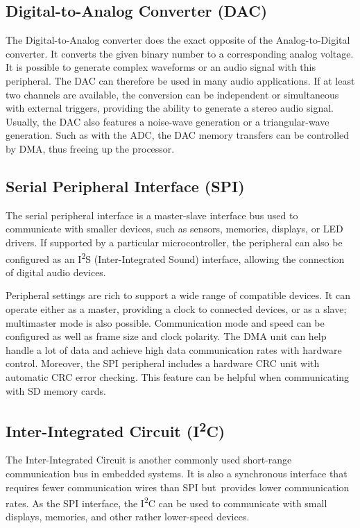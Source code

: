 	\subsection{Digital-to-Analog Converter (DAC)}
	\label{sub:dac}
The Digital-to-Analog converter does the exact opposite of the Analog-to-Digital converter. It converts the given binary number to a corresponding analog voltage. It is possible to generate complex waveforms or an audio signal with this peripheral. The DAC can therefore be used in many audio applications. If at least two channels are available, the conversion can be independent or simultaneous with external triggers, providing the ability to generate a stereo audio signal. Usually, the DAC also features a noise-wave generation or a triangular-wave generation. Such as with the ADC, the DAC memory transfers can be controlled by DMA, thus freeing up the processor.

	\subsection{Serial Peripheral Interface (SPI)}
	\label{sub:spi}
The serial peripheral interface is a master-slave interface bus used to communicate with smaller devices, such as sensors, memories, displays, or LED drivers. If supported by a particular microcontroller, the peripheral can also be configured as an I\textsuperscript{2}S (Inter-Integrated Sound) interface, allowing the connection of digital audio devices.

Peripheral settings are rich to support a wide range of compatible devices. It can operate either as a master, providing a clock to connected devices, or as a slave; multimaster mode is also possible. Communication mode and speed can be configured as well as frame size and clock polarity. The DMA unit can help handle a lot of data and achieve high data communication rates with hardware control. Moreover, the SPI peripheral includes a hardware CRC unit with automatic CRC error checking. This feature can be helpful when communicating with SD memory cards.

	\subsection{Inter-Integrated Circuit (I\textsuperscript{2}C)}
	\label{sub:i2c}
The Inter-Integrated Circuit is another commonly used short-range communication bus in embedded systems. It is also a synchronous interface that requires fewer communication wires than SPI but~provides lower communication rates. As the SPI interface, the I\textsuperscript{2}C can be used to communicate with small displays, memories, and other rather lower-speed devices.

